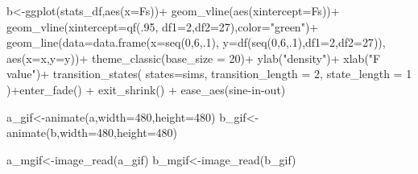 \documentclass[
  letterpaper,
  DIV=11,
  numbers=noendperiod]{scrreprt}
\newenvironment{Shaded}{\begin{snugshade}}{\end{snugshade}}
\newcommand{\AttributeTok}[1]{\textcolor[rgb]{0.40,0.45,0.13}{#1}}
\newcommand{\DecValTok}[1]{\textcolor[rgb]{0.68,0.00,0.00}{#1}}
\newcommand{\FunctionTok}[1]{\textcolor[rgb]{0.28,0.35,0.67}{#1}}
\newcommand{\NormalTok}[1]{\textcolor[rgb]{0.00,0.23,0.31}{#1}}
\newcommand{\OtherTok}[1]{\textcolor[rgb]{0.00,0.23,0.31}{#1}}
\newcommand{\SpecialCharTok}[1]{\textcolor[rgb]{0.37,0.37,0.37}{#1}}
\newcommand{\StringTok}[1]{\textcolor[rgb]{0.13,0.47,0.30}{#1}}
\begin{document}
\begin{Shaded}
\begin{Highlighting}[]
\NormalTok{b}\OtherTok{\textless{}{-}}\FunctionTok{ggplot}\NormalTok{(stats\_df,}\FunctionTok{aes}\NormalTok{(}\AttributeTok{x=}\NormalTok{Fs))}\SpecialCharTok{+}
  \FunctionTok{geom\_vline}\NormalTok{(}\FunctionTok{aes}\NormalTok{(}\AttributeTok{xintercept=}\NormalTok{Fs))}\SpecialCharTok{+}
  \FunctionTok{geom\_vline}\NormalTok{(}\AttributeTok{xintercept=}\FunctionTok{qf}\NormalTok{(.}\DecValTok{95}\NormalTok{, }\AttributeTok{df1=}\DecValTok{2}\NormalTok{,}\AttributeTok{df2=}\DecValTok{27}\NormalTok{),}\AttributeTok{color=}\StringTok{"green"}\NormalTok{)}\SpecialCharTok{+}
  \FunctionTok{geom\_line}\NormalTok{(}\AttributeTok{data=}\FunctionTok{data.frame}\NormalTok{(}\AttributeTok{x=}\FunctionTok{seq}\NormalTok{(}\DecValTok{0}\NormalTok{,}\DecValTok{6}\NormalTok{,.}\DecValTok{1}\NormalTok{),}
                            \AttributeTok{y=}\FunctionTok{df}\NormalTok{(}\FunctionTok{seq}\NormalTok{(}\DecValTok{0}\NormalTok{,}\DecValTok{6}\NormalTok{,.}\DecValTok{1}\NormalTok{),}\AttributeTok{df1=}\DecValTok{2}\NormalTok{,}\AttributeTok{df2=}\DecValTok{27}\NormalTok{)),}
            \FunctionTok{aes}\NormalTok{(}\AttributeTok{x=}\NormalTok{x,}\AttributeTok{y=}\NormalTok{y))}\SpecialCharTok{+}
  \FunctionTok{theme\_classic}\NormalTok{(}\AttributeTok{base\_size =} \DecValTok{20}\NormalTok{)}\SpecialCharTok{+}
  \FunctionTok{ylab}\NormalTok{(}\StringTok{"density"}\NormalTok{)}\SpecialCharTok{+}
  \FunctionTok{xlab}\NormalTok{(}\StringTok{"F value"}\NormalTok{)}\SpecialCharTok{+}
  \FunctionTok{transition\_states}\NormalTok{(}
    \AttributeTok{states=}\NormalTok{sims,}
    \AttributeTok{transition\_length =} \DecValTok{2}\NormalTok{,}
    \AttributeTok{state\_length =} \DecValTok{1}
\NormalTok{  )}\SpecialCharTok{+}\FunctionTok{enter\_fade}\NormalTok{() }\SpecialCharTok{+} 
  \FunctionTok{exit\_shrink}\NormalTok{() }\SpecialCharTok{+}
  \FunctionTok{ease\_aes}\NormalTok{(}\StringTok{\textquotesingle{}sine{-}in{-}out\textquotesingle{}}\NormalTok{)}

\NormalTok{a\_gif}\OtherTok{\textless{}{-}}\FunctionTok{animate}\NormalTok{(a,}\AttributeTok{width=}\DecValTok{480}\NormalTok{,}\AttributeTok{height=}\DecValTok{480}\NormalTok{)}
\NormalTok{b\_gif}\OtherTok{\textless{}{-}}\FunctionTok{animate}\NormalTok{(b,}\AttributeTok{width=}\DecValTok{480}\NormalTok{,}\AttributeTok{height=}\DecValTok{480}\NormalTok{)}

\NormalTok{a\_mgif}\OtherTok{\textless{}{-}}\FunctionTok{image\_read}\NormalTok{(a\_gif)}
\NormalTok{b\_mgif}\OtherTok{\textless{}{-}}\FunctionTok{image\_read}\NormalTok{(b\_gif)}


\end{Highlighting}
\end{Shaded}
\end{document}
